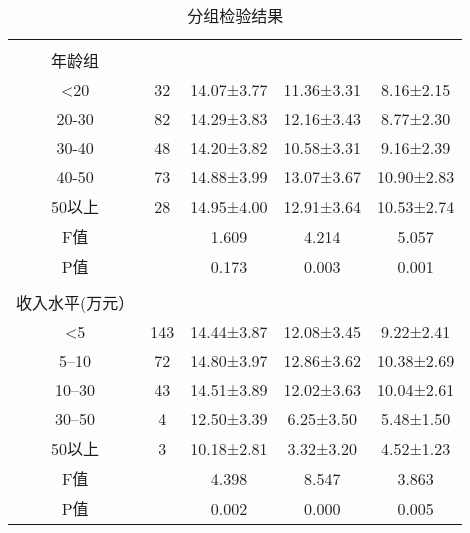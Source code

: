 \documentclass{article}
\begin{document}
\begin{table}[]
\begin{tabular}{ccccc}
        &                             &                                    &            &            \\
        年龄组                        &                             &                                    &            &            \\
        \textless{}20              & 32                          & 14.07±3.77                         & 11.36±3.31 & 8.16±2.15  \\
        20-30                      & 82                          & 14.29±3.83                         & 12.16±3.43 & 8.77±2.30  \\
        30-40                      & 48                          & 14.20±3.82                         & 10.58±3.31 & 9.16±2.39  \\
        40-50                      & 73                          & 14.88±3.99                         & 13.07±3.67 & 10.90±2.83 \\
        50以上                       & 28                          & 14.95±4.00                         & 12.91±3.64 & 10.53±2.74 \\
        F值                         &                             & 1.609                              & 4.214      & 5.057      \\
        P值                         &                             & 0.173                              & 0.003      & 0.001      \\
        &                             &                                    &            &            \\
        收入水平(万元）                   &                             &                                    &            &            \\
        \textless{}5               & 143                         & 14.44±3.87                         & 12.08±3.45 & 9.22±2.41  \\
        5--10                      & 72                          & 14.80±3.97                         & 12.86±3.62 & 10.38±2.69 \\
        10--30                     & 43                          & 14.51±3.89                         & 12.02±3.63 & 10.04±2.61 \\
        30--50                     & 4                           & 12.50±3.39                         & 6.25±3.50  & 5.48±1.50  \\
        50以上                       & 3                           & 10.18±2.81                         & 3.32±3.20  & 4.52±1.23  \\
        F值                         &                             & 4.398                              & 8.547      & 3.863      \\
        P值                         &                             & 0.002                              & 0.000      & 0.005     
    \end{tabular}
\caption{分组检验结果}
\end{table}
\end{document}
